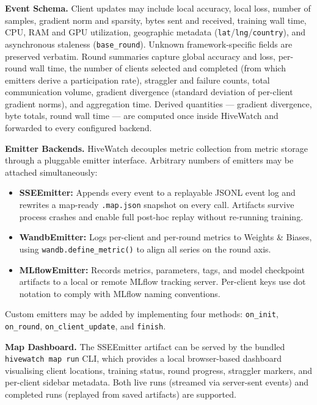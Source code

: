 \textbf{Event Schema.}
Client updates may include local accuracy, local loss, number of samples, gradient norm and sparsity, bytes sent and received, training wall time, CPU, RAM and GPU utilization, geographic metadata (\texttt{lat}/\texttt{lng}/\texttt{country}), and asynchronous staleness (\texttt{base\_round}). Unknown framework-specific fields are preserved verbatim. Round summaries capture global accuracy and loss, per-round wall time, the number of clients selected and completed (from which emitters derive a participation rate), straggler and failure counts, total communication volume, gradient divergence (standard deviation of per-client gradient norms), and aggregation time. Derived quantities — gradient divergence, byte totals, round wall time — are computed once inside HiveWatch and forwarded to every configured backend.

\textbf{Emitter Backends.}
HiveWatch decouples metric collection from metric storage through a pluggable emitter interface. Arbitrary numbers of emitters may be attached simultaneously:

\begin{itemize}[noitemsep]
    \item \textbf{SSEEmitter:} Appends every event to a replayable JSONL event log and rewrites a map-ready \texttt{.map.json} snapshot on every call. Artifacts survive process crashes and enable full post-hoc replay without re-running training.
    \item \textbf{WandbEmitter:} Logs per-client and per-round metrics to Weights \& Biases, using \texttt{wandb.define\_metric()} to align all series on the round axis.
    \item \textbf{MLflowEmitter:} Records metrics, parameters, tags, and model checkpoint artifacts to a local or remote MLflow tracking server. Per-client keys use dot notation to comply with MLflow naming conventions.
\end{itemize}

Custom emitters may be added by implementing four methods: \texttt{on\_init}, \texttt{on\_round}, \texttt{on\_client\_update}, and \texttt{finish}.

\textbf{Map Dashboard.}
The SSEEmitter artifact can be served by the bundled \texttt{hivewatch map run} CLI, which provides a local browser-based dashboard visualising client locations, training status, round progress, straggler markers, and per-client sidebar metadata. Both live runs (streamed via server-sent events) and completed runs (replayed from saved artifacts) are supported.

